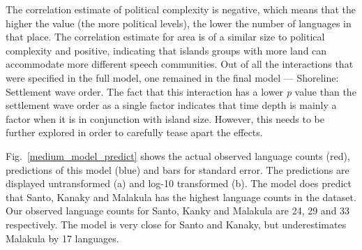 \documentclass[a4paper,10pt]{article} %
\begin{document}
The correlation estimate of political complexity is negative, which means that the higher the value (the more political levels), the lower the number of languages in that place. The correlation estimate for area is of a similar size to political complexity and positive, indicating that islands groups with more land can accommodate more different speech communities. Out of all the interactions that were specified in the full model, one remained in the final model --- Shoreline: Settlement wave order. The fact that this interaction has a lower \emph{p} value than the settlement wave order as a single factor indicates that time depth is mainly a factor when it is in conjunction with island size. However, this needs to be further explored in order to carefully tease apart the effects.

Fig.~\ref{medium_model_predict} shows the actual observed language counts (red), predictions of this model (blue) and bars for standard error. The predictions are displayed untransformed (a) and log-10 transformed (b). The model does predict that Santo, Kanaky and Malakula has the highest language counts in the dataset. Our observed language counts for Santo, Kanky and Malakula are 24, 29 and 33 respectively. The model is very close for Santo and Kanaky, but underestimates Malakula by 17 languages.
\end{document}
